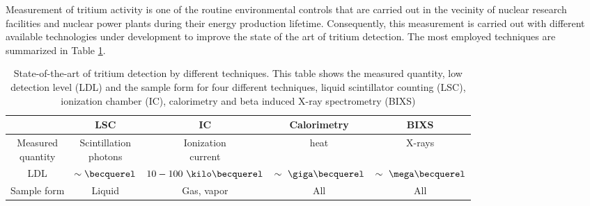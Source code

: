 Measurement of tritium activity is one of the routine environmental controls that are carried out in the vecinity of nuclear research facilities and nuclear power plants during their energy production lifetime. Consequently, this measurement is carried out with different available technologies under development to improve the state of the art of tritium detection. The most employed techniques are summarized in Table \ref{tab:DifferentThecnics}.

\begin{table}[htbp]
\begin{center}
\begin{tabular}{|c|c|c|c|c|}
\hline
 & LSC & IC & Calorimetry & BIXS\\
\hline \hline \hline
\parbox{5em}{\centering Measured\\ quantity} & \parbox{5em}{\centering Scintillation\\ photons} &  \parbox{5em}{\centering Ionization\\ current} & heat & X-rays\\ \hline
LDL & $\sim\becquerel$ & $10-100~\kilo\becquerel$ & $\sim~\giga\becquerel$ & $\sim~\mega\becquerel$ \\ \hline
Sample form & Liquid & Gas, vapor & All & All \\ \hline
\end{tabular}
\caption{State-of-the-art of tritium detection by different techniques. This table shows the measured quantity, low detection level (LDL) and the sample form for four different techniques, liquid scintillator counting (LSC), ionization chamber (IC), calorimetry and beta induced X-ray spectrometry (BIXS)}
\label{tab:DifferentThecnics}
\end{center}
\end{table}


